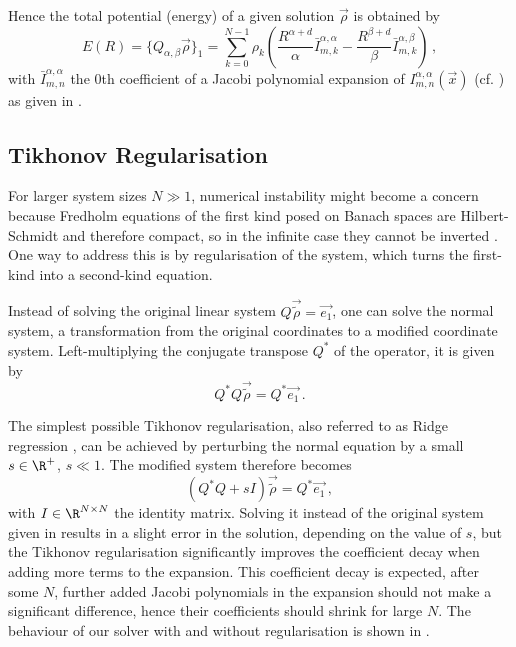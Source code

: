 
Hence the total potential (energy) of a given solution $\vec{\rho}$ is obtained by
\begin{equation}
  E(R) = \{Q_{\alpha,\beta} \vec{\rho}\}_1 = \sum_{k=0}^{N-1} \rho_k \left(\frac{R^{\alpha+d}}{\alpha} \bar{I}_{m,k}^{\alpha,\alpha} - \frac{R^{\beta+d}}{\beta} \bar{I}_{m,k}^{\alpha,\beta}\right)\,,
  \label{eq:total-energy-for-ansatz}
\end{equation}
with $\bar{I}_{m,n}^{\alpha,\alpha}$ the 0th coefficient of a Jacobi polynomial expansion of $I_{m,n}^{\alpha,\alpha}(\vec{x})$ (cf. ) as given in .

\subsection{Tikhonov Regularisation}
\label{sec:regularisation}
For larger system sizes $N \gg 1$, numerical instability might become a concern because Fredholm equations of the first kind posed on Banach spaces are Hilbert-Schmidt and therefore compact, so in the infinite case they cannot be inverted \parencite{2021-arbitrary-dimensions}.
One way to address this is by regularisation of the system, which turns the first-kind into a second-kind equation.

Instead of solving the original linear system $Q \vec{\tilde{\rho}} = \vec{e_1}$, one can solve the normal system, a transformation from the original coordinates to a modified coordinate system.
Left-multiplying the conjugate transpose $Q^*$ of the operator, it is given by
$$Q^* Q \vec{\tilde{\rho}} = Q^* \vec{e_1}\,.$$

The simplest possible Tikhonov regularisation, also referred to as Ridge regression \parencite{1970-ridge-regression}, can be achieved by perturbing the normal equation by a small $s \in \R^+$, $s \ll 1$.
The modified system therefore becomes
$$(Q^* Q + sI) \vec{\tilde{\rho}} = Q^* \vec{e_1}\,,$$
with $I \in \R^{N \times N}$ the identity matrix.
Solving it instead of the original system given in  results in a slight error in the solution, depending on the value of $s$, but the Tikhonov regularisation significantly improves the coefficient decay when adding more terms to the expansion.
This coefficient decay is expected, after some $N$, further added Jacobi polynomials in the expansion should not make a significant difference, hence their coefficients should shrink for large $N$.
The behaviour of our solver with and without regularisation is shown in .
